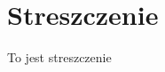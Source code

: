 \documentclass[document.tex]{subfiles}
\begin{document}
\chapter{Streszczenie}
To jest streszczenie
\end{document}
